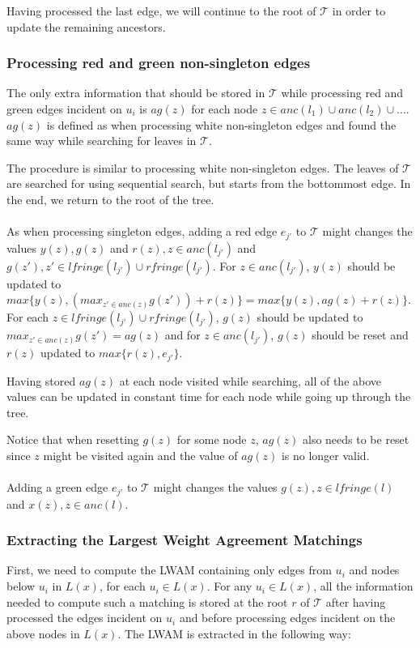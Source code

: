 Having processed the last edge, we will continue to the root of $\mathcal{T}$ in order to update the remaining ancestors.

\subsubsection{Processing red and green non-singleton edges} 
The only extra information that should be stored in $\mathcal{T}$ while processing red and green edges incident on $u_i$ is $ag(z)$ for each node $z \in {anc(l_1) \cup anc(l_2) \cup ... }$. $ag(z)$ is defined as when processing white non-singleton edges and found the same way while searching for leaves in $\mathcal{T}$.

The procedure is similar to processing white non-singleton edges. The leaves of $\mathcal{T}$ are searched for using sequential search, but starts from the bottommost edge. In the end, we return to the root of the tree.
\\
\\
As when processing singleton edges, adding a red edge $e_{j'}$ to $\mathcal{T}$ might changes the values $y(z), g(z)$ and $r(z), z \in anc(l_{j'})$ and $g(z'), z' \in lfringe(l_{j'}) \cup rfringe(l_{j'})$. For $z \in anc(l_{j'})$, $y(z)$ should be updated to $max\{y(z), (max_{z' \in anc(z)} g(z')) + r(z)\} = max\{y(z), ag(z) + r(z)\}$. For each $z \in lfringe(l_{j'}) \cup rfringe(l_{j'})$, $g(z)$ should be updated to $max_{z' \in anc(z)} g(z') = ag(z)$ and for $z \in anc(l_{j'})$, $g(z)$ should be reset and $r(z)$ updated to $max\{r(z), e_{j'}\}$.

Having stored $ag(z)$ at each node visited while searching, all of the above values can be updated in constant time for each node while going up through the tree.

Notice that when resetting $g(z)$ for some node $z$, $ag(z)$ also needs to be reset since $z$ might be visited again and the value of $ag(z)$ is no longer valid.
\\
\\
Adding a green edge $e_{j'}$ to $\mathcal{T}$ might changes the values $g(z), z \in lfringe(l)$ and $x(z), z \in anc(l)$. 


\subsubsection{Extracting the Largest Weight Agreement Matchings}
First, we need to compute the LWAM containing only edges from $u_i$ and nodes below $u_i$ in $L(x)$, for each $u_i \in L(x)$. For any $u_i \in L(x)$, all the information needed to compute such a matching is stored at the root $r$ of $\mathcal{T}$ after having processed the edges incident on $u_i$ and before processing edges incident on the above nodes in $L(x)$. The LWAM is extracted in the following way:

